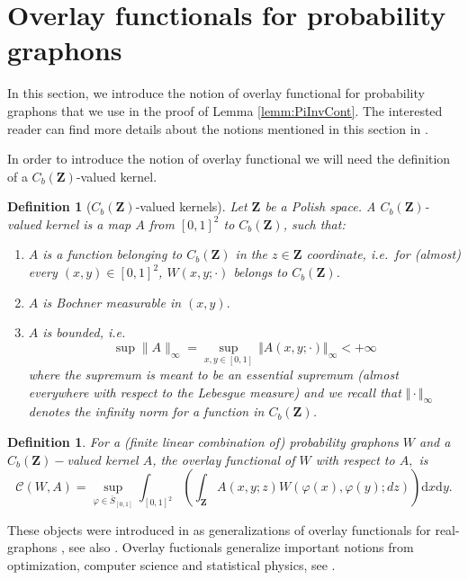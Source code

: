 \documentclass[12pt,twoside,a4paper]{article}
\newtheorem{definition}[theorem]{Definition}
\newcommand{\Space}{\mathbf{Z}}
\newcommand{\CbFunct}{C_b(\Space)}
\newcommand{\TotalMass}[1]{\norm{#1}_\infty}
\newcommand{\Relabel}{\bar{S}_{[0,1]}}
\newcommand{\norm}[1]{\Vert#1\Vert}
\begin{document}
\section{Overlay functionals for probability graphons}


In this section, we introduce the notion of overlay functional for probability graphons that we use in the proof of Lemma \ref{lemm:PiInvCont}. The interested reader can find more details about the notions mentioned in this section in \cite{zucal2024probabilitygraphonsrightconvergence}.

In order to introduce the notion of overlay functional we will need the definition of a $\CbFunct$-valued kernel. 

\begin{definition}[$\CbFunct$-valued kernels]\label{DefCBValuedKernel}
Let $\Space$ be a Polish space. A \emph{$\CbFunct$-valued kernel} is a map $A$ from $[0,1]^2$  to $\CbFunct$, 
such that:
\begin{enumerate}
\item   $A$  is a function belonging to $\CbFunct$ in the $z\in \Space$ coordinate, i.e.\ for (almost) every $(x,y) \in [0,1]^2$, $W(x,y;\cdot)$ belongs to $ \CbFunct$.
\item $A$ is \emph{Bochner measurable} in $(x,y).$
\item $A$ is \emph{bounded}, i.e.\
\begin{equation}
  \label{eq:def:TMCb}
\sup\|A\|_{\infty}=    \sup_{x,y\in [0, 1] }\, \TotalMass{A(x, y; \cdot)} <+\infty 
  \end{equation}where the supremum is meant to be an essential supremum (almost everywhere with respect to the Lebesgue measure) and we recall that $\TotalMass{\cdot}$ denotes the infinity norm for a function in $\CbFunct$.

\end{enumerate}
\end{definition}

\begin{definition}\label{ref:OverlayFun}
For a (finite linear combination of) probability graphons $W$ and a $\CbFunct-$valued kernel $A$, the overlay functional of $W$ with respect to $A,$ is
\begin{equation}
\mathcal{C}( W,A)=\sup_{\varphi\in \Relabel} \int_{[0,1]^2}   \left(\int_{\Space}A(x,y;z)W(\varphi(x), \varphi(y);dz)\right) \mathrm{d}x \mathrm{d}y. 
\end{equation}
\end{definition}
These objects were introduced in \cite[Section 4.1]{zucal2024probabilitygraphonsrightconvergence} as generalizations of overlay functionals for real-graphons \cite{borgs2011convergentAnnals}, see also \cite[Section 12]{LovaszGraphLimits}. Overlay fuctionals generalize important notions from optimization, computer science and statistical physics, see \cite{borgs2011convergentAnnals,LovaszGraphLimits}. 
\end{document}

